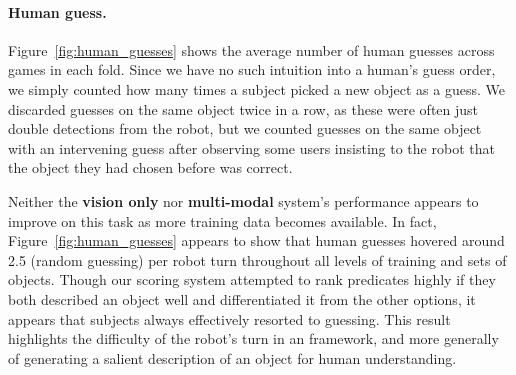 \paragraph{Human guess.}
Figure~\ref{fig:human_guesses} shows the average number of human guesses across games in each fold.
Since we have no such intuition into a human's guess order, we simply counted how many times a subject picked a new object as a guess.
We discarded guesses on the same object twice in a row, as these were often just double detections from the robot, but we counted guesses on the same object with an intervening guess after observing some users insisting to the robot that the object they had chosen before was correct.

Neither the \textbf{vision only} nor \textbf{multi-modal} system's performance appears to improve on this task as more training data becomes available.
In fact, Figure~\ref{fig:human_guesses} appears to show that human guesses hovered around 2.5 (random guessing) per robot turn throughout all levels of training and sets of objects.
Though our scoring system attempted to rank predicates highly if they both described an object well and differentiated it from the other options, it appears that subjects always effectively resorted to guessing.
This result highlights the difficulty of the robot's turn in an \ispy framework, and more generally of generating a salient description of an object for human understanding.
